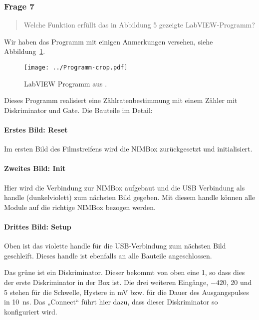 \documentclass[11pt, ngerman, fleqn, DIV=15, headinclude, BCOR=2cm]{scrreprt}
\begin{document}
\subsubsection{Frage 7}

\begin{quote}
    Welche Funktion erfüllt das in Abbildung 5 gezeigte LabVIEW-Programm?
\end{quote}

Wir haben das Programm mit einigen Anmerkungen versehen, siehe
Abbildung~\ref{fig:labview-test}.

\begin{figure}[htbp]
    \centering
    \texttt{[image: ../Programm-crop.pdf]}
    \caption{%
        LabVIEW Programm aus \parencite[Abbildung~5]{physik512-Anleitung}.
    }
    \label{fig:labview-test}
\end{figure}

Dieses Programm realisiert eine Zählratenbestimmung mit einem Zähler mit
Diskriminator und Gate. Die Bauteile im Detail:

\paragraph{Erstes Bild: Reset}

Im ersten Bild des Filmstreifens wird die NIMBox zurückgesetzt und
initialisiert.

\paragraph{Zweites Bild: Init}

Hier wird die Verbindung zur NIMBox aufgebaut und die USB Verbindung als handle
(dunkelviolett) zum nächsten Bild gegeben. Mit diesem handle können alle Module
auf die richtige NIMBox bezogen werden.

\paragraph{Drittes Bild: Setup}

Oben ist das violette handle für die USB-Verbindung zum nächsten Bild
geschleift. Dieses handle ist ebenfalls an alle Bauteile angeschlossen.

Das grüne ist ein Diskriminator. Dieser bekommt von oben eine 1, so dass dies
der erste Diskriminator in der Box ist. Die drei weiteren Eingänge, $-420$, 20
und 5 stehen für die Schwelle, Hystere in \si{\milli\volt} bzw. für die Dauer
des Ausgangspulses in \SI{10}{\nano\second}. Das „Connect“ führt hier dazu,
dass dieser Diskriminator so konfiguriert wird.
\end{document}
